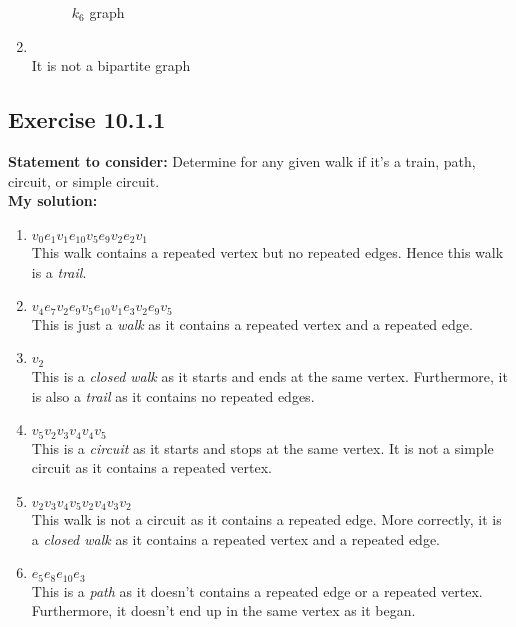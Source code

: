 \documentclass{report}
\newcommand{\assignmentDescription}{\textbf{Statement to consider: }}
\newcommand{\solution}{\textbf{My solution: }}
\newcommand{\Exercise}[1]{\subsection{Exercise #1}}
\newcommand{\defaultEnumerateLabel}{\textbf{\alph*.}}
\newcommand{\emptyItem}{\item \,\\}
\newcommand{\myItem}[1]{\item #1\\}
\begin{document}
\begin{enumerate}[label=\defaultEnumerateLabel]
\begin{figure}[H]
			\caption{$k_6$ graph}
		\end{figure}
		
		\emptyItem
		
		It is not a bipartite graph
	\end{enumerate}
	
	\Exercise{10.1.1}
	
	\assignmentDescription
	Determine for any given walk if it's a train, path, circuit, or simple circuit.\\
	
	\solution
	
	\begin{enumerate}[label=\defaultEnumerateLabel]
		\item $v_0 e_1 v_1e_{10} v_5 e_9 v_2 e_2 v_1$\\
		
		This walk contains a repeated vertex but no repeated edges. Hence this walk is a \textit{trail}.
		
		\myItem{$v_4 e_7 v_2 e_9 v_5 e_{10} v_1 e_3 v_2 e_9 v_5$}
		
		This is just a \textit{walk} as it contains a repeated vertex and a repeated edge. 
		
		\myItem{$v_2$}
		
		This is a \textit{closed walk} as it starts and ends at the same vertex. Furthermore, it is also a \textit{trail} as it contains no repeated edges.
		
		\myItem{$v_5 v_2 v_3 v_4 v_4 v_5$}
		
		This is a \textit{circuit} as it starts and stops at the same vertex. It is not a simple circuit as it contains a repeated vertex.
		
		\myItem{$v_2 v_3 v_4 v_5 v_2 v_4 v_3 v_2$}
		
		This walk is not a circuit as it contains a repeated edge. More correctly, it is a \textit{closed walk} as it contains a repeated vertex and a repeated edge.
		
		\myItem{$e_5 e_8 e_{10} e_3$}
		
		This is a \textit{path} as it doesn't contains a repeated edge or a repeated vertex. Furthermore, it doesn't end up in the same vertex as it began.
		
		
	\end{enumerate}
	
\end{document}
